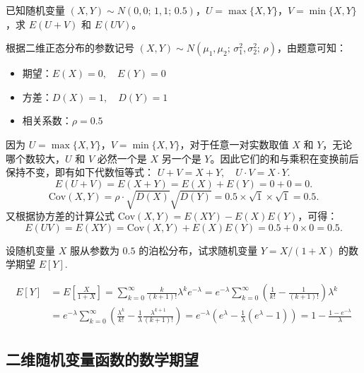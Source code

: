 \documentclass[lang=cn,11pt]{elegantbook}
\begin{document}
\begin{exercise}\label{exer:4-s9-maxbvn}
已知随机变量 \((X,Y) \sim N(0,0;\,1,1;\,0.5)\)，\(U = \max\{X,Y\}\)，\(V = \min\{X,Y\}\)，求 \(E(U+V)\) 和 \(E(UV)\)。
\end{exercise}
\begin{solution}
根据二维正态分布的参数记号 \((X,Y) \sim N(\mu_1, \mu_2;\, \sigma_1^2, \sigma_2^2;\, \rho)\)，由题意可知：
\begin{itemize}
    \item 期望：$E(X) = 0,\quad E(Y) = 0$
    \item 方差：$D(X) = 1,\quad D(Y) = 1$
    \item 相关系数：$\rho = 0.5$
\end{itemize}
因为 $U = \max\{X,Y\}$，$V = \min\{X,Y\}$，对于任意一对实数取值 $X$ 和 $Y$，无论哪个数较大，$U$ 和 $V$ 必然一个是 $X$ 另一个是 $Y$。因此它们的和与乘积在变换前后保持不变，即有如下代数恒等式：
\(
U + V = X + Y, \quad U \cdot V = X \cdot Y.
\)
\[
E(U+V) = E(X+Y) = E(X) + E(Y) = 0 + 0 = 0.
\]
\[
\mathrm{Cov}(X,Y) = \rho \cdot \sqrt{D(X)} \sqrt{D(Y)} = 0.5 \times \sqrt{1} \times \sqrt{1} = 0.5.
\]
又根据协方差的计算公式 $\mathrm{Cov}(X,Y) = E(XY) - E(X)E(Y)$，可得：
\[
E(UV) = E(XY) = \mathrm{Cov}(X,Y) + E(X)E(Y) = 0.5 + 0 \times 0 = 0.5.
\]
\end{solution}


\begin{exercise}
设随机变量 $X$ 服从参数为 $0.5$ 的泊松分布，试求随机变量 $Y = X/(1+X)$ 的数学期望 $E[Y]$.
\end{exercise}
\begin{solution}
\begin{align*}
E[Y] &= E\left[\frac{X}{1+X}\right] = \sum_{k=0}^{\infty} \frac{k}{(k+1)!}\lambda^k e^{-\lambda} = e^{-\lambda}\sum_{k=0}^{\infty} \left(\frac1{k!} - \frac{1}{(k+1)!}\right)\lambda^k\\
&=e^{-\lambda}\sum_{k=0}^{\infty} \left(\frac{\lambda^k}{k!} - \frac1\lambda\frac{\lambda^{k+1}}{(k+1)!}\right)=e^{-\lambda}(e^{\lambda}-\frac{1}{\lambda}(e^{\lambda}-1))= 1 - \frac{1 - e^{-\lambda}}{\lambda}
\end{align*}
\end{solution}


\subsection{二维随机变量函数的数学期望}
\end{document}
